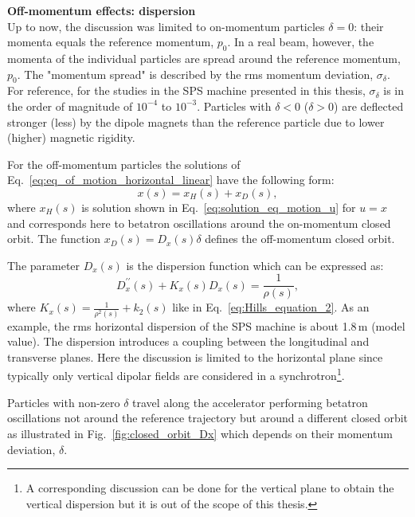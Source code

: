 \textbf{Off-momentum effects: dispersion}\\
Up to now, the discussion was limited to on-momentum particles $\delta=0$: their momenta equals the reference momentum, $p_0$. In a real beam, however, the momenta of the individual particles are spread around the reference momentum, $p_0$. The "momentum spread" is described by the rms momentum deviation, $\sigma_\delta$. For reference, for the studies in the SPS machine presented in this thesis, $\sigma_\delta$ is in the order of magnitude of $10^{-4}$ to $10^{-3}$. Particles with $\delta < 0$ ($\delta>0$) are deflected stronger (less) by the dipole magnets than the reference particle due to lower (higher) magnetic rigidity.

For the off-momentum particles the solutions of Eq.~\eqref{eq:eq_of_motion_horizontal_linear} have the following form:
\begin{equation}
    x(s) = x_H(s) + x_D(s),
\end{equation}
where $x_H(s)$ is solution shown in Eq.~\eqref{eq:solution_eq_motion_u} for $u=x$ and corresponds here to betatron oscillations around the on-momentum closed orbit. %
The function $x_D(s)=D_x(s) \delta$ defines the off-momentum closed orbit. 

The parameter $D_x(s)$ is the dispersion function which can be expressed as:
\begin{equation}\label{eq:dispersion_function}
    D^{\prime \prime}_x(s) + K_x(s)D_x(s) = \frac{1}{\rho(s)},
\end{equation}
where $K_x(s)= \frac{1}{\rho^2(s)}+k_2(s)$ like in Eq.~\eqref{eq:Hills_equation_2}. As an example, the rms horizontal dispersion of the SPS machine is about 1.8\,m (model value). The dispersion introduces a coupling between the longitudinal and transverse planes. Here the discussion is limited to the horizontal plane since typically only vertical dipolar fields are considered in a synchrotron\footnote{A corresponding discussion can be done for the vertical plane to obtain the vertical dispersion but it is out of the scope of this thesis.}.

Particles with non-zero $\delta$ travel along the accelerator performing betatron oscillations not around the reference trajectory but around a different closed orbit as illustrated in Fig.~\ref{fig:closed_orbit_Dx} which depends on their momentum deviation, $\delta$. 



